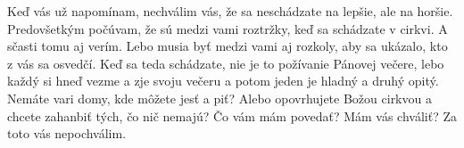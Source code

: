 Keď vás už napomínam, nechválim vás, že sa neschádzate na lepšie, ale na horšie. 
Predovšetkým počúvam, že sú medzi vami roztržky, keď sa schádzate v cirkvi. A sčasti tomu aj verím. 
Lebo musia byť medzi vami aj rozkoly, aby sa ukázalo, kto z vás sa osvedčí.
Keď sa teda schádzate, nie je to požívanie Pánovej večere, 
lebo každý si hneď vezme a zje svoju večeru a potom jeden je hladný a druhý opitý.
Nemáte vari domy, kde môžete jesť a piť? Alebo opovrhujete Božou cirkvou a chcete zahanbiť tých, čo nič nemajú? Čo vám mám povedať? Mám vás chváliť? Za toto vás nepochválim.